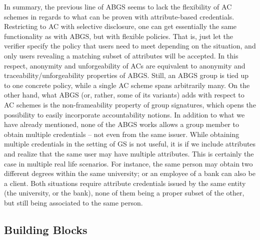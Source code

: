 In summary, the previous line of ABGS seems to lack the flexibility of AC
schemes in regards to what can be proven with attribute-based credentials.
Restricting to AC with selective disclosure, one can get essentially the same
functionality as with ABGS, but with flexible policies. That is, just let
the verifier specify the policy that users need to meet depending on the
situation, and only users revealing a matching subset of attributes will be
accepted. In this respect, anonymity and unforgeability of ACs are equivalent to
anonymity and traceability/unforgeability properties of ABGS. Still, an ABGS
group is tied up to one concrete policy, while a single AC scheme spans
arbitrarily many.
%
On the other hand, what ABGS (or, rather, some of its variants) adds with
respect to AC schemes is the non-frameability property of group signatures,
which opens the possibility to easily incorporate accountability notions.
%
In addition to what we have already mentioned, none of the ABGS works allows
a group member to obtain multiple credentials -- not even from the same issuer.
While obtaining multiple credentials in the setting of GS is not useful, it is
if we include attributes and realize that the same user may have multiple
attributes. This is certainly the case in multiple real life scenarios. For
instance, the same person may obtain two different degrees within the same
university; or an employee of a bank can also be a client. Both situations
require attribute credentials issued by the same entity (the university, or
the bank), none of them being a proper subset of the other, but still being
associated to the same person.


\subsection{Building Blocks}
\label{ssec:bblocks}

